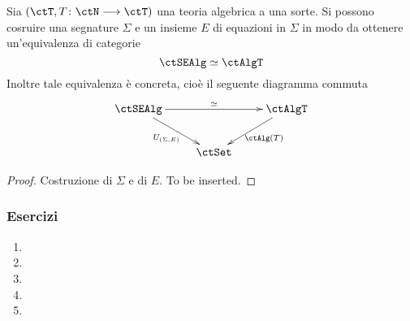 \begin{proposition}\label{prop_confr_sigma_tunasorte_bis}
Sia $(\ctT, T \colon \ctN \fun \ctT)$ una teoria algebrica a una sorte. Si possono cosruire una segnature $\Sigma$ e un insieme $E$ di equazioni 
in $\Sigma$ in modo da ottenere un'equivalenza di categorie
\[
  \ctSEAlg \simeq \ctAlgT 
\]
Inoltre tale equivalenza è concreta, cioè il seguente diagramma commuta
\[\xymatrix{
	\ctSEAlg \ar[rr]^-{\simeq} \ar[rd]_{U_{(\Sigma,E)}} & & \ctAlgT \ar[ld]^{\ctAlg(T)} \\
& \ctSet 
}
\]
\end{proposition}

\begin{proof}
Costruzione di $\Sigma$ e di $E$. To be inserted.
\end{proof} 


\subsubsection*{Esercizi}
\begin{enumerate}
	\item
	\item
	\item
	\item
	\item
\end{enumerate}
